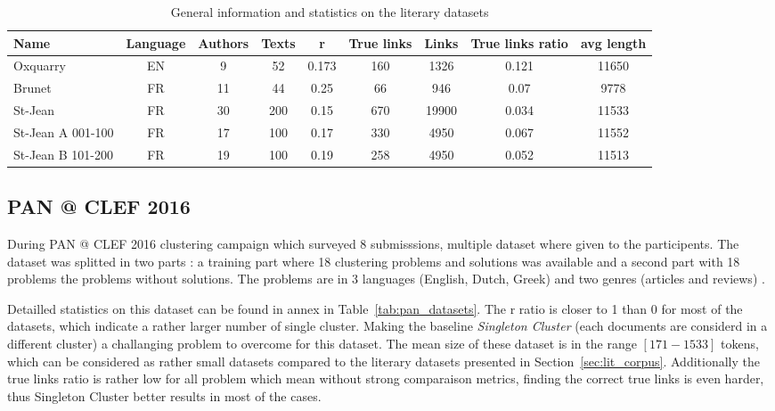 \begin{table}[t]
  \caption{General information and statistics on the literary datasets}
  \label{tab:lit_datasets}
  \begin{tabular}{ l c c c c c c c c }
    \toprule
    \textbf{Name} &
    \textbf{Language} &
    \textbf{Authors} &
    \textbf{Texts} &
    \textbf{r} &
    \textbf{True links} &
    \textbf{Links} &
    \textbf{True links ratio} &
    \textbf{avg length} \\
    \midrule
    Oxquarry & EN & 9 & 52 & 0.173 & 160 & 1326 & 0.121 & 11650 \\
    Brunet & FR & 11 & 44 & 0.25 & 66 & 946 & 0.07 & 9778 \\
    St-Jean & FR & 30 & 200 & 0.15 & 670 & 19900 & 0.034 & 11533 \\
    St-Jean A 001-100 & FR & 17 & 100 & 0.17 & 330 & 4950 & 0.067 & 11552 \\
    St-Jean B 101-200 & FR & 19 & 100 & 0.19 & 258 & 4950 & 0.052 & 11513 \\
    \bottomrule
  \end{tabular}
\end{table}


\subsection{PAN @ CLEF 2016}

During PAN @ CLEF 2016 clustering campaign which surveyed 8 submisssions, multiple dataset where given to the participents.
The dataset was splitted in two parts : a training part where 18 clustering problems and solutions was available and a second part with 18 problems the problems without solutions.
The problems are in 3 languages (English, Dutch, Greek) and two genres (articles and reviews) \cite{pan16}.

Detailled statistics on this dataset can be found in annex in Table~\ref{tab:pan_datasets}.
The r ratio is closer to 1 than 0 for most of the datasets, which indicate a rather larger number of single cluster.
Making the baseline \textit{Singleton Cluster} (each documents are considerd in a different cluster) a challanging problem to overcome for this dataset.
The mean size of these dataset is in the range $[171-1533]$ tokens, which can be considered as rather small datasets compared to the literary datasets presented in Section~\ref{sec:lit_corpus}.
Additionally the true links ratio is rather low for all problem which mean without strong comparaison metrics, finding the correct true links is even harder, thus Singleton Cluster better results in most of the cases.

